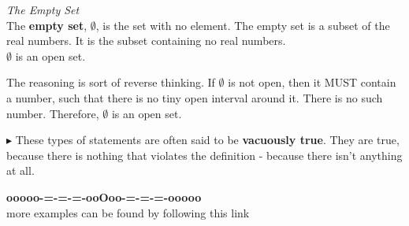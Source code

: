 \documentclass{ximera}
\begin{document}
\begin{example}  \textit{The Empty Set} \\


The \textbf{empty set}, $\emptyset$, is the set with no element.  The empty set is a subset of the real numbers.  It is the subset containing no real numbers. \\


$\emptyset$ is an open set. \\



\begin{explanation}


The reasoning is sort of reverse thinking.  If $\emptyset$ is not open, then it MUST contain a number, such that there is no tiny open interval around it.  There is no such number.  Therefore, $\emptyset$ is an open set.


\end{explanation}

\end{example}

$\blacktriangleright$ These types of statements are often said to be \textbf{vacuously true}.  They are true, because there is nothing that violates the definition - because there isn't anything at all. 











\begin{center}
\textbf{\textcolor{green!50!black}{ooooo-=-=-=-ooOoo-=-=-=-ooooo}} \\

more examples can be found by following this link\\ 

\end{center}
\end{document}
